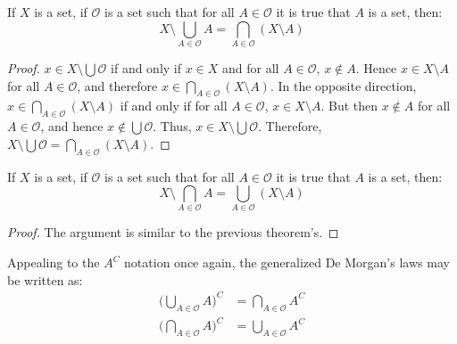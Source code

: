             \begin{theorem}
                If $X$ is a set, if $\mathcal{O}$ is a set such that for all
                $A\in\mathcal{O}$ it is true that $A$ is a set, then:
                \begin{equation}
                    X\setminus\bigcup_{A\in\mathcal{O}}A=
                        \bigcap_{A\in\mathcal{O}}(X\setminus{A})
                \end{equation}
            \end{theorem}
            \begin{proof}
                $x\in{X}\setminus\bigcup\mathcal{O}$ if and only if
                $x\in{X}$ and for all $A\in\mathcal{O}$, $x\notin{A}$. Hence
                $x\in{X}\setminus{A}$ for all $A\in\mathcal{O}$, and therefore
                $x\in\bigcap_{A\in\mathcal{O}}(X\setminus{A})$. In the opposite
                direction, $x\in\bigcap_{A\in\mathcal{O}}(X\setminus{A})$ if
                and only if for all $A\in\mathcal{O}$, $x\in{X}\setminus{A}$.
                But then $x\notin{A}$ for all $A\in\mathcal{O}$, and hence
                $x\notin\bigcup\mathcal{O}$. Thus,
                $x\in{X}\setminus\bigcup\mathcal{O}$. Therefore,
                $X\setminus\bigcup\mathcal{O}=\bigcap_{A\in\mathcal{O}}(X\setminus{A})$.
            \end{proof}
            \begin{theorem}
                If $X$ is a set, if $\mathcal{O}$ is a set such that for all
                $A\in\mathcal{O}$ it is true that $A$ is a set, then:
                \begin{equation}
                    X\setminus\bigcap_{A\in\mathcal{O}}A=
                        \bigcup_{A\in\mathcal{O}}(X\setminus{A})
                \end{equation}
            \end{theorem}
            \begin{proof}
                The argument is similar to the previous theorem's.
            \end{proof}
            Appealing to the $A^{C}$ notation once again, the generalized
            De Morgan's laws may be written as:
            \begin{align}
                \Big(\bigcup_{A\in\mathcal{O}}A\Big)^{C}
                    &=\bigcap_{A\in\mathcal{O}}A^{C}\\
                \Big(\bigcap_{A\in\mathcal{O}}A\Big)^{C}
                    &=\bigcup_{A\in\mathcal{O}}A^{C}
            \end{align}
